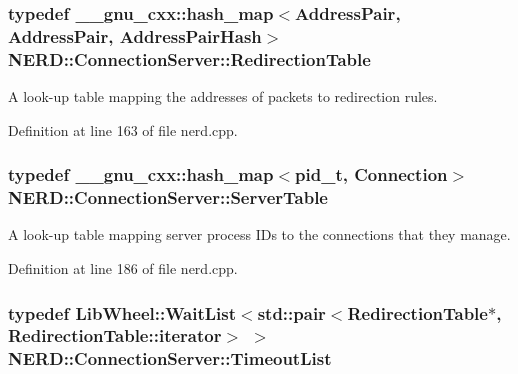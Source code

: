 \hypertarget{classNERD_1_1ConnectionServer_a1f7b6abdda0f0a7a027a5f2e24727cee}{
\subsubsection[{\-Redirection\-Table}]{\setlength{\rightskip}{0pt plus 5cm}typedef \-\_\-\-\_\-gnu\-\_\-cxx\-::hash\-\_\-map$<${\bf \-Address\-Pair}, {\bf \-Address\-Pair}, {\bf \-Address\-Pair\-Hash}$>$ {\bf \-N\-E\-R\-D\-::\-Connection\-Server\-::\-Redirection\-Table}}}
\label{classNERD_1_1ConnectionServer_a1f7b6abdda0f0a7a027a5f2e24727cee}


\-A look-\/up table mapping the addresses of packets to redirection rules. 



\-Definition at line 163 of file nerd.\-cpp.

\hypertarget{classNERD_1_1ConnectionServer_a0cd661f2a6755c501ac198229675ad4d}{
\subsubsection[{\-Server\-Table}]{\setlength{\rightskip}{0pt plus 5cm}typedef \-\_\-\-\_\-gnu\-\_\-cxx\-::hash\-\_\-map$<$pid\-\_\-t, {\bf \-Connection}$>$ {\bf \-N\-E\-R\-D\-::\-Connection\-Server\-::\-Server\-Table}}}
\label{classNERD_1_1ConnectionServer_a0cd661f2a6755c501ac198229675ad4d}


\-A look-\/up table mapping server process \-I\-Ds to the connections that they manage. 



\-Definition at line 186 of file nerd.\-cpp.

\hypertarget{classNERD_1_1ConnectionServer_a63d211040487b4566f2f696026723932}{
\subsubsection[{\-Timeout\-List}]{\setlength{\rightskip}{0pt plus 5cm}typedef {\bf \-Lib\-Wheel\-::\-Wait\-List}$<$std\-::pair$<${\bf \-Redirection\-Table}$\ast$, \-Redirection\-Table\-::iterator$>$ $>$ {\bf \-N\-E\-R\-D\-::\-Connection\-Server\-::\-Timeout\-List}}}
\label{classNERD_1_1ConnectionServer_a63d211040487b4566f2f696026723932}


